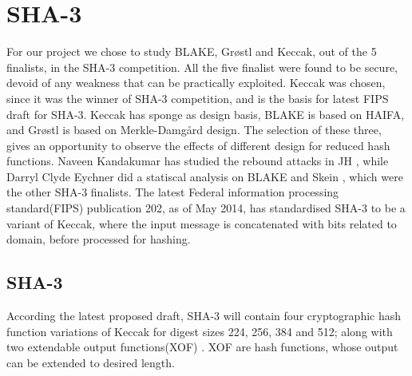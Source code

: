 \chapter{SHA-3}

For our project we chose to study BLAKE, Gr{\o}stl and Keccak, out of the 5 finalists, in the SHA-3 competition. 
All the five finalist were found to be secure, devoid of any weakness that can be practically exploited. Keccak
was chosen, since it was the winner of SHA-3 competition, and is the basis for latest FIPS draft for SHA-3.
Keccak has sponge as design basis, BLAKE is based on HAIFA, and Gr{\o}stl
is based on Merkle-Damg\r{a}rd design. The selection of these three, gives an opportunity to observe the effects 
of different design for reduced hash functions. Naveen Kandakumar has studied the rebound attacks in JH \cite{00043},
while Darryl Clyde Eychner did a statiscal analysis on BLAKE and Skein \cite{00030}, which were the other SHA-3 finalists.
The latest Federal information processing standard(FIPS) publication 202, as of May 2014, has standardised SHA-3 to
be a variant of Keccak, where the input message is concatenated with bits related to domain, before processed 
for hashing.

\section{SHA-3}

According the latest proposed draft, SHA-3 will contain four cryptographic hash function variations of Keccak for digest 
sizes 224, 256, 384 and 512; along with two extendable output functions(XOF) \cite{00042}. XOF are hash functions,
whose output can be extended to desired length.

